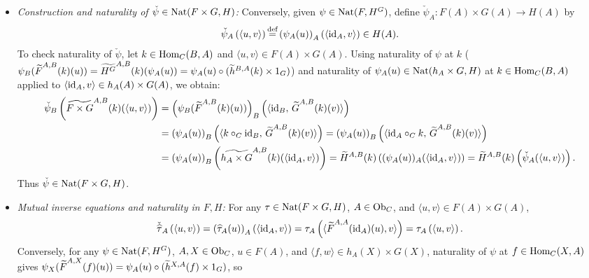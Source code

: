 \documentclass[10pt,a4paper]{article}
\begin{document}
\begin{enumerate}
\begin{itemize}
$$\widetilde{H^G}^{A,B}(k)\left(\widehat{\tau}_A(u)\right) = \tau \circ (\Phi_{A,F}(u) \times 1_G) \circ (\widetilde{h}^{B,A}(k) \times 1_G) = \tau \circ \left((\Phi_{A,F}(u) \circ \widetilde{h}^{B,A}(k)) \times 1_G\right) = \tau \circ \left(\Phi_{B,F}(\FMor^{A,B}(k)(u)) \times 1_G\right) = \widehat{\tau}_B\left(\FMor^{A,B}(k)(u)\right).$$
Thus $\widehat{\tau} \in \Nat(F, H^G)$.
\item \emph{Construction and naturality of $\check{\psi} \in {\textrm{Nat}}(F \times G, H)$:} Conversely, given $\psi \in {\textrm{Nat}}(F, H^G)$, define $\check{\psi}_A : F(A) \times G(A) \to H(A)$ by
$$\check{\psi}_A\left(\langle u, v \rangle\right) {\stackrel{{\textrm{def}}}{=}} \left(\psi_A(u)\right)_A\left(\langle {\textrm{id}}_A, v \rangle\right) \in H(A).$$
To check naturality of $\check{\psi}$, let $k \in {\textrm{Hom}}_C(B, A)$ and $\langle u, v \rangle \in F(A) \times G(A)$. Using naturality of $\psi$ at $k$ ($\psi_B({\widetilde{F}\textrm{}}^{A,B}(k)(u)) = \widetilde{H^G}^{A,B}(k)(\psi_A(u)) = \psi_A(u) \circ (\widetilde{h}^{B,A}(k) \times 1_G)$) and naturality of $\psi_A(u) \in {\textrm{Nat}}(h_A \times G, H)$ at $k \in {\textrm{Hom}}_C(B, A)$ applied to $\langle {\textrm{id}}_A, v \rangle \in h_A(A) \times G(A)$, we obtain:
\begin{align*}
\check{\psi}_B\left(\widetilde{F \times G}^{A,B}(k)(\langle u, v \rangle)\right) &= \left(\psi_B({\widetilde{F}\textrm{}}^{A,B}(k)(u))\right)_B\left(\langle {\textrm{id}}_B,\, {\widetilde{G}\textrm{}}^{A,B}(k)(v) \rangle\right) \\
&= \left(\psi_A(u)\right)_B\left(\langle k \circ_C {\textrm{id}}_B,\, {\widetilde{G}\textrm{}}^{A,B}(k)(v) \rangle\right) = \left(\psi_A(u)\right)_B\left(\langle {\textrm{id}}_A \circ_C k,\, {\widetilde{G}\textrm{}}^{A,B}(k)(v) \rangle\right) \\
&= \left(\psi_A(u)\right)_B\left(\widetilde{h_A \times G}^{A,B}(k)(\langle {\textrm{id}}_A, v \rangle)\right) = \widetilde{H}^{A,B}(k)\left((\psi_A(u))_A(\langle {\textrm{id}}_A, v \rangle)\right) = \widetilde{H}^{A,B}(k)\left(\check{\psi}_A(\langle u, v \rangle)\right).
\end{align*}
Thus $\check{\psi} \in {\textrm{Nat}}(F \times G, H)$.
\item \emph{Mutual inverse equations and naturality in $F, H$:} For any $\tau \in {\textrm{Nat}}(F \times G, H)$, $A \in {\textrm{Ob}}_C$, and $\langle u, v \rangle \in F(A) \times G(A)$,
$$\check{\widehat{\tau}}_A\left(\langle u, v \rangle\right) = \left(\widehat{\tau}_A(u)\right)_A\left(\langle {\textrm{id}}_A, v \rangle\right) = \tau_A\left(\langle {\widetilde{F}\textrm{}}^{A,A}({\textrm{id}}_A)(u), v \rangle\right) = \tau_A\left(\langle u, v \rangle\right).$$
Conversely, for any $\psi \in {\textrm{Nat}}(F, H^G)$, $A, X \in {\textrm{Ob}}_C$, $u \in F(A)$, and $\langle f, w \rangle \in h_A(X) \times G(X)$, naturality of $\psi$ at $f \in {\textrm{Hom}}_C(X, A)$ gives $\psi_X({\widetilde{F}\textrm{}}^{A,X}(f)(u)) = \psi_A(u) \circ (\widetilde{h}^{X,A}(f) \times 1_G)$, so

\end{itemize}
\end{enumerate}
\end{document}
